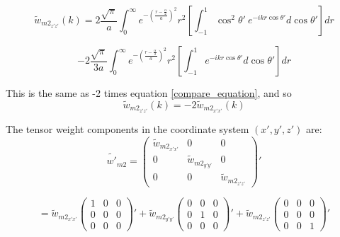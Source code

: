 \documentclass[double,12pt]{beavtex}
\begin{document}
\color{blue}
\begin{displaymath}{\widetilde{w}_{{m2}_{z'z'}}(k)=2\frac{\sqrt{\pi}}{a}\int_{0}^{\infty}e^{-\left(\frac{r-\frac{\alpha}{2}}{a}\right)^2}r^2\left[\int_{-1}^{1}\cos^2\theta'~e^{-ikr\cos\theta'}d{\cos\theta'}\right]d{r}}\end{displaymath} 

\begin{equation}{-2\frac{\sqrt{\pi}}{3a}\int_{0}^{\infty}e^{-\left(\frac{r-\frac{\alpha}{2}}{a}\right)^2}r^2\left[\int_{-1}^{1}e^{-ikr\cos\theta'}d{\cos\theta'}\right]d{r}}\end{equation}
\color{black} 

This is the same as -2 times equation \ref{compare_equation}, and so \begin{equation}{\widetilde{w}_{{m2}_{z'z'}}(k)=-2\widetilde{w}_{{m2}_{x'x'}}(k)}\end{equation}

\noindent The tensor weight components in the coordinate system $(x',y',z')$ are:
\begin{equation}\label{tensorcomp}{\widetilde{w'}_{m2}=\left(\begin{array}{ccc} \widetilde{w}_{{m2}_{x'x'}} & 0 & 0 \\ 0 & \widetilde{w}_{{m2}_{y'y'}} & 0 \\ 0 & 0 & \widetilde{w}_{{m2}_{z'z'}} \end{array}\right)'}\end{equation}

\begin{displaymath}{=\widetilde{w}_{{m2}_{x'x'}}\left(\begin{array}{ccc} 1 & 0 & 0 \\ 0 & 0 & 0 \\ 0 & 0 & 0 \end{array}\right)'+ \widetilde{w}_{{m2}_{y'y'}}\left(\begin{array}{ccc} 0 & 0 & 0 \\ 0 & 1 & 0 \\ 0 & 0 & 0 \end{array}\right)' + \widetilde{w}_{{m2}_{z'z'}}\left(\begin{array}{ccc} 0 & 0 & 0 \\ 0 & 0 & 0 \\ 0 & 0 & 1 \end{array}\right)'}\end{displaymath}
\end{document}
